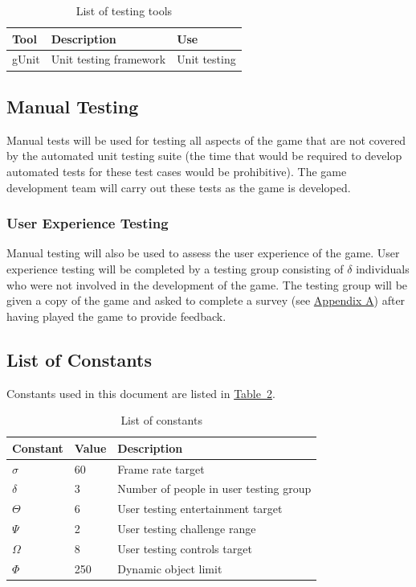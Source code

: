 \documentclass[12pt, titlepage]{article}
\begin{document}
\begin{table}[ht]
\caption{List of testing tools} \label{tab:tools}
\begin{tabularx}{\textwidth}{p{2.3cm}p{4.5cm}X}
\toprule {\bf Tool} & {\bf Description} & {\bf Use}\\
\midrule
gUnit & Unit testing framework & Unit testing\\
\bottomrule
\end{tabularx}
\end{table}

\subsection{Manual Testing}
Manual tests will be used for testing all aspects of the game that are not covered by the automated unit testing suite (the time that would be required to develop automated tests for these test cases would be prohibitive).  The game development team will carry out these tests as the game is developed.

\subsubsection{User Experience Testing}
\label{sec:userexp}
Manual testing will also be used to assess the user experience of the game.  User experience testing will be completed by a testing group consisting of $\hyperref[tab:constants]{\delta}$ individuals who were not involved in the development of the game.  The testing group will be given a copy of the game and asked to complete a survey (see \hyperref[sec:survey]{Appendix A}) after having played the game to provide feedback.


\subsection{List of Constants}
Constants used in this document are listed in \hyperref[tab:constants]{Table~\ref*{tab:constants}}.
\begin{table}[ht]
\caption{List of constants} \label{tab:constants}
\begin{tabularx}{\textwidth}{p{3cm}p{2cm}X}
\toprule {\bf Constant} & {\bf Value} & {\bf Description}\\
\midrule
$\sigma$ & 60 & Frame rate target\\
$\delta$ & 3 & Number of people in user testing group\\
$\Theta$ & 6 & User testing entertainment target\\
$\Psi$ & 2 & User testing challenge range\\
$\Omega$ & 8 & User testing controls target\\
$\Phi$ & 250 & Dynamic object limit\\
\bottomrule
\end{tabularx}
\end{table}
\end{document}
